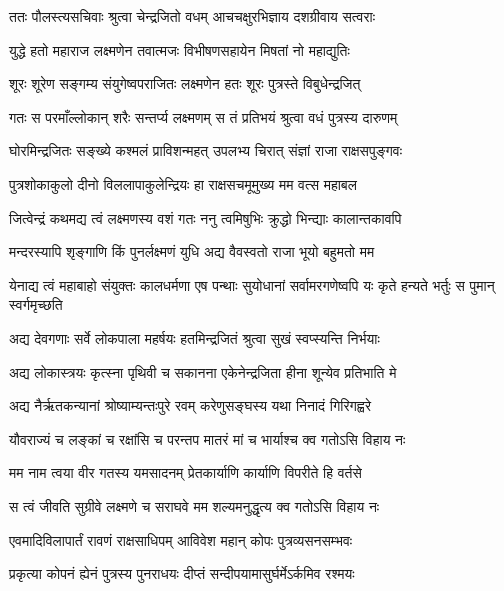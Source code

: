 
\twolineshloka
{ततः पौलस्त्यसचिवाः श्रुत्वा चेन्द्रजितो वधम्}
{आचचक्षुरभिज्ञाय दशग्रीवाय सत्वराः} %

\twolineshloka
{युद्धे हतो महाराज लक्ष्मणेन तवात्मजः}
{विभीषणसहायेन मिषतां नो महाद्युतिः} %

\twolineshloka
{शूरः शूरेण सङ्गम्य संयुगेष्वपराजितः}
{लक्ष्मणेन हतः शूरः पुत्रस्ते विबुधेन्द्रजित्} %

\twolineshloka
{गतः स परमाँल्लोकान् शरैः सन्तर्प्य लक्ष्मणम्}
{स तं प्रतिभयं श्रुत्वा वधं पुत्रस्य दारुणम्} %

\twolineshloka
{घोरमिन्द्रजितः सङ्ख्ये कश्मलं प्राविशन्महत्}
{उपलभ्य चिरात् संज्ञां राजा राक्षसपुङ्गवः} %

\twolineshloka
{पुत्रशोकाकुलो दीनो विललापाकुलेन्द्रियः}
{हा राक्षसचमूमुख्य मम वत्स महाबल} %

\twolineshloka
{जित्वेन्द्रं कथमद्य त्वं लक्ष्मणस्य वशं गतः}
{ननु त्वमिषुभिः क्रुद्धो भिन्द्याः कालान्तकावपि} %

\twolineshloka
{मन्दरस्यापि शृङ्गाणि किं पुनर्लक्ष्मणं युधि}
{अद्य वैवस्वतो राजा भूयो बहुमतो मम} %

\threelineshloka
{येनाद्य त्वं महाबाहो संयुक्तः कालधर्मणा}
{एष पन्थाः सुयोधानां सर्वामरगणेष्वपि}
{यः कृते हन्यते भर्तुः स पुमान् स्वर्गमृच्छति} %

\twolineshloka
{अद्य देवगणाः सर्वे लोकपाला महर्षयः}
{हतमिन्द्रजितं श्रुत्वा सुखं स्वप्स्यन्ति निर्भयाः} %

\twolineshloka
{अद्य लोकास्त्रयः कृत्स्ना पृथिवी च सकानना}
{एकेनेन्द्रजिता हीना शून्येव प्रतिभाति मे} %

\twolineshloka
{अद्य नैर्ऋतकन्यानां श्रोष्याम्यन्तःपुरे रवम्}
{करेणुसङ्घस्य यथा निनादं गिरिगह्वरे} %

\twolineshloka
{यौवराज्यं च लङ्कां च रक्षांसि च परन्तप}
{मातरं मां च भार्याश्च क्व गतोऽसि विहाय नः} %

\twolineshloka
{मम नाम त्वया वीर गतस्य यमसादनम्}
{प्रेतकार्याणि कार्याणि विपरीते हि वर्तसे} %

\twolineshloka
{स त्वं जीवति सुग्रीवे लक्ष्मणे च सराघवे}
{मम शल्यमनुद्धृत्य क्व गतोऽसि विहाय नः} %

\twolineshloka
{एवमादिविलापार्तं रावणं राक्षसाधिपम्}
{आविवेश महान् कोपः पुत्रव्यसनसम्भवः} %

\twolineshloka
{प्रकृत्या कोपनं ह्येनं पुत्रस्य पुनराधयः}
{दीप्तं सन्दीपयामासुर्घर्मेऽर्कमिव रश्मयः} %

